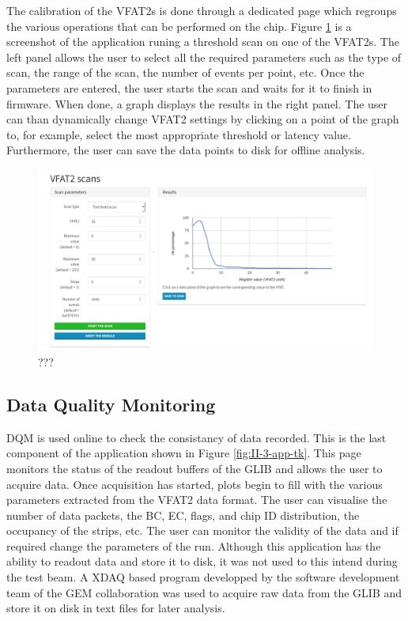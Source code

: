       The calibration of the VFAT2s is done through a dedicated page which regroups the various operations that can be performed on the chip. Figure \ref{fig:II-3-app-calibration} is a screenshot of the application runing a threshold scan on one of the VFAT2s. The left panel allows the user to select all the required parameters such as the type of scan, the range of the scan, the number of events per point, etc. Once the parameters are entered, the user starts the scan and waits for it to finish in firmware. When done, a graph displays the results in the right panel. The user can than dynamically change VFAT2 settings by clicking on a point of the graph to, for example, select the most appropriate threshold or latency value. Furthermore, the user can save the data points to disk for offline analysis.

      \begin{figure}[h!]
        \centering
        \includegraphics[width=\textwidth]{img/II-3-test-beam/app-scan.png}
        \caption{???}
        \label{fig:II-3-app-calibration}
      \end{figure}

    \subsection{Data Quality Monitoring}

      DQM is used online to check the consistancy of data recorded. This is the last component of the application shown in Figure \ref{fig:II-3-app-tk}. This page monitors the status of the readout buffers of the GLIB and allows the user to acquire data. Once acquisition has started, plots begin to fill with the various parameters extracted from the VFAT2 data format. The user can visualise the number of data packets, the BC, EC, flags, and chip ID distribution, the occupancy of the strips, etc. The user can monitor the validity of the data and if required change the parameters of the run. Although this application has the ability to readout data and store it to disk, it was not used to this intend during the test beam. A XDAQ based program developped by the software development team of the GEM collaboration was used to acquire raw data from the GLIB and store it on disk in text files for later analysis.


